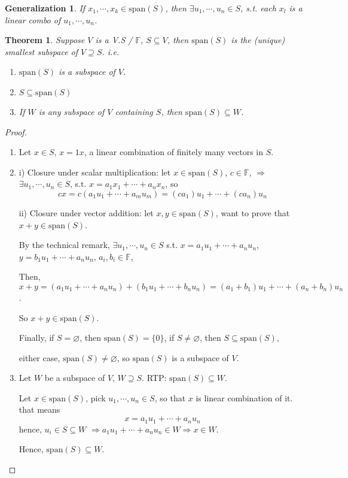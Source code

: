 \documentclass[12pt]{article}
\newtheorem{theorem}{Theorem}[subsection]
\newtheorem{generalization}{Generalization}[subsection]
\newcommand{\Span}{\mathrm{span}}
\newcommand{\mF}{{\mathbb{F}}}
\let\emptyset\varnothing
\begin{document}
	
	\begin{generalization}
		If $x_1,\cdots, x_k \in \Span(S)$, then $\exists u_1, \cdots, u_n \in S$,
		s.t. each $x_l$ is a linear combo of $u_1, \cdots, u_n$. \\
	\end{generalization}

	\begin{theorem}
		Suppose $V$ is a V.S / $\mF$, $S\subseteq V$, then $\Span(S)$ is the
		(unique) smallest subspace of $V \supseteq S$. 
		i.e. 
		\begin{enumerate}
			\item $\Span(S)$ is a subspace of $V$.
			\item $S \subseteq \Span(S)$
			\item If $W$ is any subspace of $V$ containing $S$, then 
				$\Span(S) \subseteq W$. 
		\end{enumerate}
	\end{theorem}
	\begin{proof}
		$ $
		\begin{enumerate}
		\item Let $x\in S$, $x = 1x$, a linear combination of finitely many 
		vectors in $S$. 

		\item  i) Closure under scalar multiplication: let $x \in \Span(S)$, 
		$c\in \mathbb{F}$, $\Rightarrow$ $\exists u_1, \cdots, u_n\in S$, s.t.
		$x = a_1x_1 + \cdots+a_nx_n$, so 
		\[
			cx = c (a_1u_1+\cdots+a_mu_m) = (ca_1)u_1+\cdots+(ca_n)u_n
		\]

		ii) Closure under vector addition: 
		let $x, y \in \Span (S)$, want to prove that $x+y \in \Span(S)$. 

		By the technical remark, $\exists u_1, \cdots, u_n \in S$ s.t. 
		$x = a_1u_1+\cdots+ a_nu_n$, $y = b_1u_1+\cdots+a_nu_n$, 
		$a_i,b_i\in\mF$,

		Then, $x+y  = (a_1u_1+\cdots+a_nu_n) + (b_1u_1+\cdots+b_nu_n)
		=(a_1+b_1)u_1+\cdots+(a_n+b_n)u_n$.
		
		So $x+y \in \Span(S)$. 

		Finally, if $S = \emptyset$, then $\Span(S) = \{0\}$, if 
		$S \neq \emptyset$, then $S\subseteq \Span(S)$, 

		either case, $\Span(S) \neq \emptyset$, so $\Span(S)$ is a 
		subspace of $V$.
	
		\item
			Let $W$ be a subspace of $V$, $W \supseteq S$. 
			RTP: $\Span(S) \subseteq W$.
	
		Let $x \in \Span(S)$, pick $u_1, \cdots, u_n \in S$, so that $x$ is 
		linear combination of it. 
		that means 
		\[
			x = a_1u_1 + \cdots + a_nu_n
		\]
		hence, $u_i \in S \subseteq W$ $\Rightarrow a_1u_1 + \cdots + a_nu_n \in W
		 \Rightarrow x \in W$. 
	
		Hence, $\Span(S) \subseteq W$.
		\end{enumerate}
	\end{proof}
		
\end{document}
